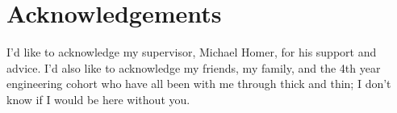 \chapter*{Acknowledgements} \label{C:ack} 
I'd like to acknowledge my supervisor, Michael Homer, for his support and advice. I'd also like to acknowledge my friends, my family, and the 4th year engineering cohort who have all been with me through thick and thin; I don't know if I would be here without you.
